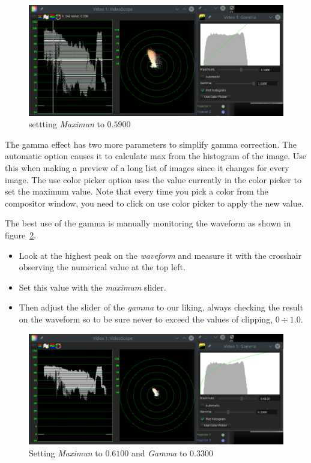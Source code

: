 \begin{figure}[htpb]
    \centering
    \includegraphics[width=0.8\linewidth]{images/gamma01.png}
    \caption{settting \textit{Maximun} to $0.5900$}
    \label{fig:gamma01}
\end{figure}

The gamma effect has two more parameters to simplify gamma correction. The automatic option causes it to calculate max from the histogram of the image. Use this when making a preview of a long list of images since it changes for every image. The use color picker option uses the value currently in the color picker to set the maximum value. Note that every time you pick a color from the compositor window, you need to click on use color picker to apply the new value.

The best use of the gamma is manually monitoring the waveform as shown in figure~\ref{fig:gamma02}.

\begin{itemize}
    \item Look at the highest peak on the \textit{waveform} and measure it with the crosshair observing the numerical value at the top left.
    \item Set this value with the \textit{maximum} slider.
    \item Then adjust the slider of the \textit{gamma} to our liking, always checking the result on the waveform so to be sure never to exceed the values of clipping, $0 \div 1.0$.
\end{itemize}

\begin{figure}[htpb]
    \centering
    \includegraphics[width=0.8\linewidth]{images/gamma02.png}
    \caption{Setting \textit{Maximun} to $0.6100$ and \textit{Gamma} to $0.3300$}
    \label{fig:gamma02}
\end{figure}

